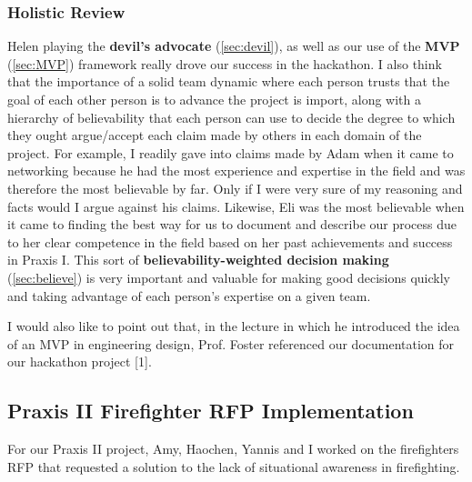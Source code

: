 \documentclass[a4paper,12pt]{article}
\begin{document}
\subsubsection{Holistic Review}

Helen playing the \textbf{devil’s advocate} (\ref{sec:devil}), as well as our use of the \textbf{MVP} (\ref{sec:MVP}) framework really drove our success in the hackathon. I also think that the importance of a solid team dynamic where each person trusts that the goal of each other person is to advance the project is import, along with a hierarchy of believability that each person can use to decide the degree to which they ought argue/accept each claim made by others in each domain of the project. For example, I readily gave into claims made by Adam when it came to networking because he had the most experience and expertise in the field and was therefore the most believable by far. Only if I were very sure of my reasoning and facts would I argue against his claims. Likewise, Eli was the most believable when it came to finding the best way for us to document and describe our process due to her clear competence in the field based on her past achievements and success in Praxis I. This sort of \textbf{believability-weighted decision making} (\ref{sec:believe}) is very important and valuable for making good decisions quickly and taking advantage of each person’s expertise on a given team.

I would also like to point out that, in the lecture in which he introduced the idea of an MVP in engineering design, Prof. Foster referenced our documentation for our hackathon project [1].

\subsection{Praxis II Firefighter RFP Implementation}
\label{sec:fire}
For our Praxis II project, Amy, Haochen, Yannis and I worked on the firefighters RFP that requested a solution to the lack of situational awareness in firefighting.
\end{document}
